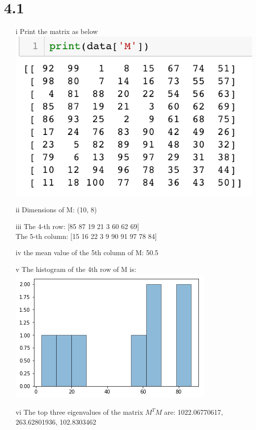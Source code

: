 \documentclass[12pt]{article}
\begin{document}
\section*{4.1}
\begin{enumerate}
\item[i]
Print the matrix as below\\
\includegraphics[scale=0.6]{1.png}

\item[ii]
Dimensions of M: (10, 8)\\

\item[iii]
The 4-th row: [85 87 19 21  3 60 62 69]\\
The 5-th column: [15 16 22  3  9 90 91 97 78 84]\\

\item[iv]
the mean value of the 5th column of M: 50.5

\item[v]
The histogram of the 4th row of M is:\\
\includegraphics[scale=0.6]{2.png}

\item[vi]
The top three eigenvalues of the matrix $M^TM$ are: 1022.06770617, 263.62801936, 102.8303462\\
\end{enumerate}
\end{document}
